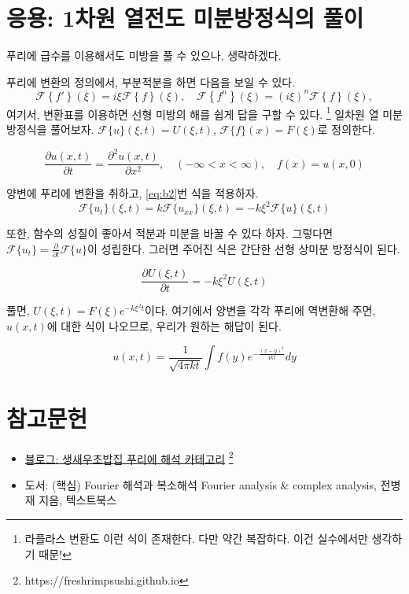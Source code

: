 \documentclass[article, oneside]{oblivoir}
\begin{document}
\section{응용: 1차원 열전도 미분방정식의 풀이}
푸리에 급수를 이용해서도 미방을 풀 수 있으나, 생략하겠다.

푸리에 변환의 정의에서, 부분적분을 하면 다음을 보일 수 있다.
\begin{equation}
    \mathcal{F}\left\{f' \right\} (\xi) = i \xi \mathcal{F}\left\{f \right\} (\xi), \quad \mathcal{F}\left\{f^n \right\} (\xi) = \left(i \xi\right)^n \mathcal{F}\left\{f \right\} (\xi), \label{eq:b2}
\end{equation}
여기서, 변환표를 이용하면 선형 미방의 해를 쉽게 답을 구할 수 있다.
\footnote{라플라스 변환도 이런 식이 존재한다. 다만 약간 복잡하다. 이건 실수에서만 생각하기 때문!}
일차원 열 미분방정식을 풀어보자.
$\mathcal{F}\{u\}(\xi, t) = U(\xi, t)$, $\mathcal{F}\{f\}(x) = F(\xi)$로 정의한다.

$$\frac{\partial u(x,t)}{\partial t} = \frac{\partial^2 u(x,t)}{\partial x^2}, \quad (-\infty < x < \infty), \quad f(x) = u(x,0) $$

양변에 푸리에 변환을 취하고, \ref{eq:b2}번 식을 적용하자.
$$\mathcal{F}\{u_t\}(\xi, t) = k \mathcal{F}\{u_{xx}\}(\xi, t) =  - k \xi^2 \mathcal{F}\{u\}(\xi, t)$$

또한, 함수의 성질이 좋아서 적분과 미분을 바꿀 수 있다 하자. 그렇다면 $\mathcal{F}\{u_t\} = \frac{\partial}{\partial t}\mathcal{F}\{u\}$이 성립한다. 그러면 주어진 식은 간단한 선형 상미분 방정식이 된다.

$$\frac{\partial U(\xi, t)}{\partial t} = - k \xi^2 U(\xi, t)$$

풀면, $U(\xi, t) = F(\xi) e^{-k \xi ^2 t}$이다. 여기에서 양변을 각각 푸리에 역변환해 주면, $u(x,t)$에 대한 식이 나오므로, 우리가 원하는 해답이 된다.

$$u(x,t) = \frac{1}{\sqrt{4 \pi k t}} \int f(y) e^{-\frac{\left(x-y\right)^2}{4 k t}} dy$$

\section{참고문헌}
\begin{itemize}
    \item \href{https://freshrimpsushi.github.io/}{블로그: 생새우초밥집 \> 푸리에 해석 카테고리} \footnote{https://freshrimpsushi.github.io}
    \item 도서: (핵심) Fourier 해석과 복소해석 Fourier analysis \& complex analysis, 전병재 지음, 텍스트북스
\end{itemize}
\end{document}
